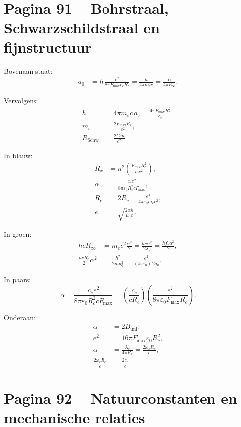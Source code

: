 \documentclass[11pt,a4paper]{article}
\begin{document}
\section*{Pagina 91 -- Bohrstraal, Schwarzschildstraal en fijnstructuur}

Bovenaan staat:
\begin{align*}
a_0
&=
h\,\frac{c^2}{8\pi F_{\max}c_eR_c}
=
\frac{h}{4\pi m_e c}
=
\frac{\alpha}{4\pi R_\infty}.
\end{align*}

Vervolgens:
\begin{align*}
h
&=
4\pi m_e c\,a_0
=
\frac{4\pi F_{\max}R_c^2}{c_e},\\
m_e
&=
\frac{2F_{\max}R_c}{c^2},\\
R_{\mathrm{Schw}}
&=
\frac{2Gm}{c^2}.
\end{align*}

In blauw:
\begin{align*}
R_x
&=
n^2\left(\frac{F_{\max}R_c^2}{mc^2}\right),\\
\alpha
&=
\frac{c_e e^2}{8\pi\varepsilon_0R_c^2cF_{\max}},\\
R_e
&=
2R_c
=
\frac{e^2}{4\pi\varepsilon_0m_ec^2},\\
e
&=
\sqrt{\frac{2\alpha h}{\mu_0 c}}.
\end{align*}

In groen:
\begin{align*}
h c R_\infty
&=
m_e c^2\frac{\alpha^2}{2}
=
\frac{hc\alpha^2}{2\lambda_e}
=
\frac{hf_e\alpha^2}{2},\\
\frac{hcR_c}{2}\alpha^2
&=
\frac{h^2}{2ma_0^2}
=
\frac{e^2}{(4\pi\varepsilon_0)\,2a_0}.
\end{align*}

In paars:
\[
\alpha
=
\frac{c_e e^2}{8\pi\varepsilon_0R_c^2cF_{\max}}
=
\left(\frac{c_e}{cR_e}\right)
\left(\frac{e^2}{8\pi\varepsilon_0F_{\max}R_c}\right).
\]

Onderaan:
\begin{align*}
\alpha &= 2B_{\mathrm{uni}},\\
e^2 &= 16\pi F_{\max}\varepsilon_0R_c^2,\\
\alpha
&=
\frac{\lambda_e}{4\pi R_e}
=
\frac{2\omega_eR_e}{c},\\
\frac{2\omega_eR_e}{c}
&=
\frac{2c_e}{c}.
\end{align*}

\section*{Pagina 92 -- Natuurconstanten en mechanische relaties}
\end{document}
